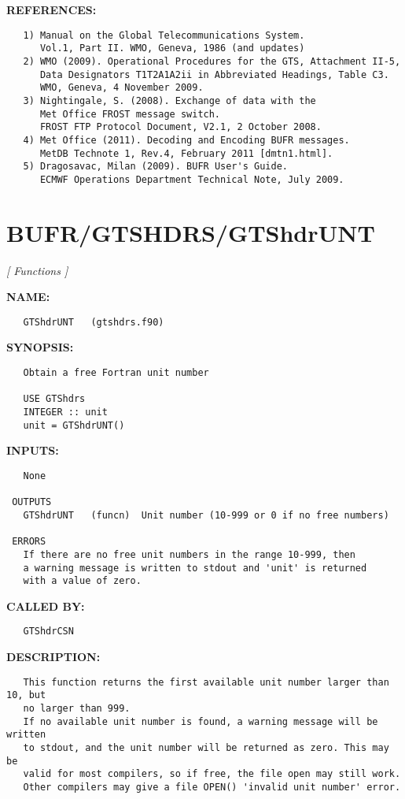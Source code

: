 \textbf{REFERENCES:}\hspace{0.08in}\begin{Verbatim}
   1) Manual on the Global Telecommunications System.
      Vol.1, Part II. WMO, Geneva, 1986 (and updates)
   2) WMO (2009). Operational Procedures for the GTS, Attachment II-5,
      Data Designators T1T2A1A2ii in Abbreviated Headings, Table C3.
      WMO, Geneva, 4 November 2009.
   3) Nightingale, S. (2008). Exchange of data with the
      Met Office FROST message switch.
      FROST FTP Protocol Document, V2.1, 2 October 2008.
   4) Met Office (2011). Decoding and Encoding BUFR messages.
      MetDB Technote 1, Rev.4, February 2011 [dmtn1.html].
   5) Dragosavac, Milan (2009). BUFR User's Guide.
      ECMWF Operations Department Technical Note, July 2009.
\end{Verbatim}
\section{BUFR/GTSHDRS/GTShdrUNT}
\textsl{[ Functions ]}

\label{ch:robo13}
\label{ch:BUFR_GTSHDRS_GTShdrUNT}
\textbf{NAME:}\hspace{0.08in}\begin{Verbatim}
   GTShdrUNT   (gtshdrs.f90)
\end{Verbatim}
\textbf{SYNOPSIS:}\hspace{0.08in}\begin{Verbatim}
   Obtain a free Fortran unit number

   USE GTShdrs
   INTEGER :: unit
   unit = GTShdrUNT()
\end{Verbatim}
\textbf{INPUTS:}\hspace{0.08in}\begin{Verbatim}
   None

 OUTPUTS
   GTShdrUNT   (funcn)  Unit number (10-999 or 0 if no free numbers)

 ERRORS
   If there are no free unit numbers in the range 10-999, then
   a warning message is written to stdout and 'unit' is returned
   with a value of zero.
\end{Verbatim}
\textbf{CALLED BY:}\hspace{0.08in}\begin{Verbatim}
   GTShdrCSN
\end{Verbatim}
\textbf{DESCRIPTION:}\hspace{0.08in}\begin{Verbatim}
   This function returns the first available unit number larger than 10, but
   no larger than 999.
   If no available unit number is found, a warning message will be written
   to stdout, and the unit number will be returned as zero. This may be
   valid for most compilers, so if free, the file open may still work.
   Other compilers may give a file OPEN() 'invalid unit number' error.
\end{Verbatim}
